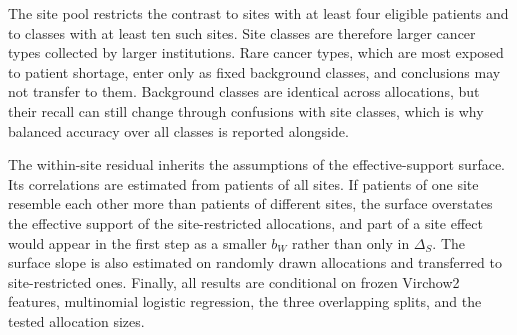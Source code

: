 \documentclass[11pt]{article}
\begin{document}
The site pool restricts the contrast to sites with at least four eligible patients and to classes with at least ten such sites. Site classes are therefore larger cancer types collected by larger institutions. Rare cancer types, which are most exposed to patient shortage, enter only as fixed background classes, and conclusions may not transfer to them. Background classes are identical across allocations, but their recall can still change through confusions with site classes, which is why balanced accuracy over all classes is reported alongside.

The within-site residual inherits the assumptions of the effective-support surface. Its correlations are estimated from patients of all sites. If patients of one site resemble each other more than patients of different sites, the surface overstates the effective support of the site-restricted allocations, and part of a site effect would appear in the first step as a smaller $b_W$ rather than only in $\Delta_S$. The surface slope is also estimated on randomly drawn allocations and transferred to site-restricted ones. Finally, all results are conditional on frozen Virchow2 features, multinomial logistic regression, the three overlapping splits, and the tested allocation sizes.



\end{document}
